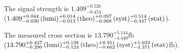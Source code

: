 The signal strength is $1.409{}^{+0.526}_{-0.454}$
\\
($1.409{}^{+0.044}_{-0.030}\,\text{(lumi)} {}^{+0.014}_{-0.013}\,\text{(theo)} {}^{+0.097}_{-0.068}\,\text{(syst)} {}^{+0.514}_{-0.447}\,\text{(stat)}$).

The measured cross section is
$13.790{}^{+5.144}_{-4.440}$\usep fb
\\
($13.790{}^{+0.427}_{-0.290}\,\text{(lumi)} {}^{+0.138}_{-0.124}\,\text{(theo)} {}^{+0.951}_{-0.662}\,\text{(syst)} {}^{+5.033}_{-4.371}\,\text{(stat)}$\usep fb).

